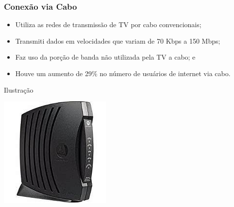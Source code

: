 \documentclass[aspectratio=169]{beamer} %
\begin{document}
\begin{frame}
	\frametitle{Conexão via Cabo}
			
	\begin{itemize}
		\item Utiliza as redes de transmissão de TV por cabo convencionais;
		\item Transmiti dados em velocidades que variam de 70 Kbps a 150 Mbps;
		\item Faz uso da porção de banda não utilizada pela TV a cabo; e
		\item Houve um aumento de 29\% no número de usuários de internet via cabo.
	\end{itemize}\vfill
	
	\begin{exampleblock}{Ilustra\c cão}
		\begin{center}
			\includegraphics[scale=0.4]{img/modem-cabo}
		\end{center}
	\end{exampleblock}
\end{frame}
\end{document}
